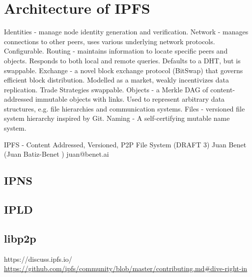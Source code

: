 \section{Architecture of IPFS}\label{seArchitecture}

{
Identities - manage node identity generation and verification.
Network - manages connections to other peers, uses various underlying network protocols. Configurable.
Routing - maintains information to locate specific peers and objects. Responds to both local and remote queries. Defaults to a DHT, but is swappable.
Exchange - a novel block exchange protocol (BitSwap) that governs efficient block distribution. Modelled as a market, weakly incentivizes data replication. Trade Strategies swappable.
Objects - a Merkle DAG of content-addressed immutable objects with links. Used to represent arbitrary data structures, e.g. file hierarchies and communication systems.
Files - versioned file system hierarchy inspired by Git.
Naming - A self-certifying mutable name system.
}

IPFS - Content Addressed, Versioned, P2P File System
(DRAFT 3)
Juan Benet (Juan Batiz-Benet )
juan@benet.ai

\subsection{IPNS}
\subsection{IPLD}
\subsection{libp2p}


https://discuss.ipfs.io/
\url{https://github.com/ipfs/community/blob/master/contributing.md#dive-right-in}
